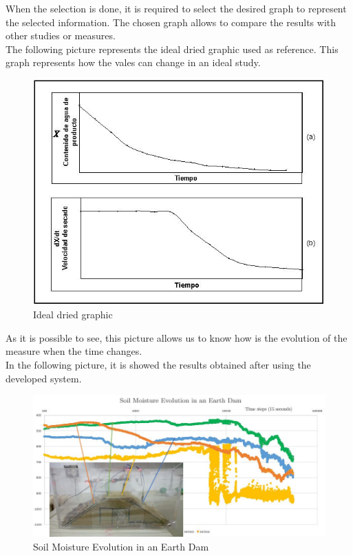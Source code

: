 When the selection is done, it is required to select the desired graph to represent the selected information. The chosen graph allows to compare the results with other studies or measures.\\

The following picture represents the ideal dried graphic used as reference. This graph represents how the vales can change in an ideal study.\\

\begin{figure}[H]
\begin{centering}
\includegraphics[scale=0.6]{IMGS/secado_ideal.jpg}
\caption{Ideal dried graphic \label{Ideal dried graphic}}
\end{centering}
\end{figure}

As it is possible to see, this picture allows us to know how is the evolution of the measure when the time changes.\\

In the following picture, it is showed the results obtained after using the developed system.

\begin{figure}[H]
\begin{centering}
\includegraphics[scale=0.6]{IMGS/results_measures.jpeg}
\caption{Soil Moisture Evolution in an Earth Dam \label{Soil Moisture Evolution in an Earth Dam}}
\end{centering}
\end{figure} 

